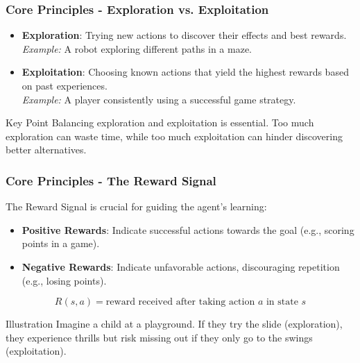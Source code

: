 \documentclass[aspectratio=169]{beamer}
\begin{document}
\begin{frame}[fragile]
    \frametitle{Core Principles - Exploration vs. Exploitation}
    \begin{itemize}
        \item \textbf{Exploration}: Trying new actions to discover their effects and best rewards.\\
              \textit{Example:} A robot exploring different paths in a maze.
              
        \item \textbf{Exploitation}: Choosing known actions that yield the highest rewards based on past experiences.\\
              \textit{Example:} A player consistently using a successful game strategy.
    \end{itemize}
    \begin{block}{Key Point}
        Balancing exploration and exploitation is essential. Too much exploration can waste time, while too much exploitation can hinder discovering better alternatives.
    \end{block}
\end{frame}

\begin{frame}[fragile]
    \frametitle{Core Principles - The Reward Signal}
    The Reward Signal is crucial for guiding the agent's learning:
    \begin{itemize}
        \item \textbf{Positive Rewards}: Indicate successful actions towards the goal (e.g., scoring points in a game).
        \item \textbf{Negative Rewards}: Indicate unfavorable actions, discouraging repetition (e.g., losing points).
    \end{itemize}
    \begin{equation}
        R(s, a) = \text{reward received after taking action } a \text{ in state } s
    \end{equation}
    \begin{block}{Illustration}
        Imagine a child at a playground. 
        If they try the slide (exploration), they experience thrills but risk missing out if they only go to the swings (exploitation).
    \end{block}
\end{frame}
\end{document}
